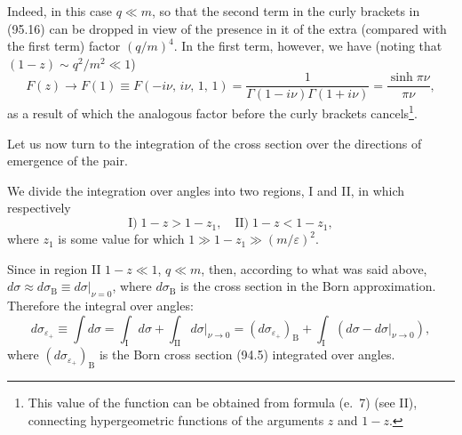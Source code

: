 Indeed, in this case $q \ll m$, so that the second term in the curly brackets in (95.16) can be dropped in view of the presence in it of the extra (compared with the first term) factor $(q/m)^4$. In the first term, however, we have (noting that $(1-z) \sim q^2/m^2 \ll 1$)
\begin{equation}
F(z) \to F(1) \equiv F(-i\nu,\,i\nu,\,1,\,1) = \frac{1}{\Gamma(1-i\nu)\Gamma(1+i\nu)} = \frac{\sinh\pi\nu}{\pi\nu},
\label{eq:95.17}
\end{equation}
as a result of which the analogous factor before the curly brackets cancels\footnote{This value of the function can be obtained from formula (e.~7) (see II), connecting hypergeometric functions of the arguments $z$ and $1-z$.}.


Let us now turn to the integration of the cross section over the directions of emergence of the pair.

We divide the integration over angles into two regions, I and II, in which respectively
\[
\text{I)}\; 1-z > 1-z_1, \quad \text{II)}\; 1-z < 1-z_1,
\]
where $z_1$ is some value for which $1 \gg 1-z_1 \gg (m/\varepsilon)^2$.

Since in region II $1-z \ll 1$, $q \ll m$, then, according to what was said above, $d\sigma \approx d\sigma_\text{B} \equiv d\sigma|_{\nu=0}$, where $d\sigma_\text{B}$ is the cross section in the Born approximation. Therefore the integral over angles:
\begin{equation}
d\sigma_{\varepsilon_+} \equiv \int d\sigma = \int_\text{I}d\sigma + \int_\text{II}d\sigma\big|_{\nu\to 0} = (d\sigma_{\varepsilon_+})_\text{B} + \int_\text{I}(d\sigma - d\sigma|_{\nu\to 0}),
\label{eq:95.18}
\end{equation}
where $(d\sigma_{\varepsilon_+})_\text{B}$ is the Born cross section (94.5) integrated over angles.

